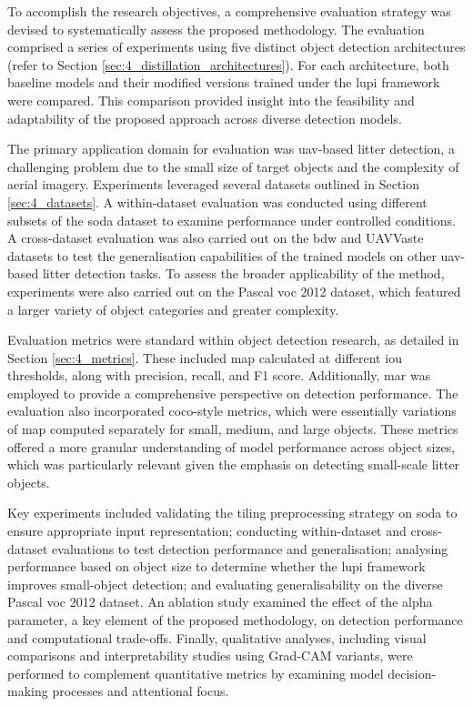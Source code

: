 To accomplish the research objectives, a comprehensive evaluation strategy was devised to systematically assess the proposed methodology. The evaluation comprised a series of experiments using five distinct object detection architectures (refer to Section \ref{sec:4_distillation_architectures}). For each architecture, both baseline models and their modified versions trained under the \gls{lupi} framework were compared. This comparison provided insight into the feasibility and adaptability of the proposed approach across diverse detection models.

The primary application domain for evaluation was \gls{uav}-based litter detection, a challenging problem due to the small size of target objects and the complexity of aerial imagery. Experiments leveraged several datasets outlined in Section \ref{sec:4_datasets}.  A within-dataset evaluation was conducted using different subsets of the \gls{soda} dataset to examine performance under controlled conditions. A cross-dataset evaluation was also carried out on the \gls{bdw} and UAVVaste datasets to test the generalisation capabilities of the trained models on other \gls{uav}-based litter detection tasks. To assess the broader applicability of the method, experiments were also carried out on the Pascal \gls{voc} 2012 dataset, which featured a larger variety of object categories and greater complexity.

Evaluation metrics were standard within object detection research, as detailed in Section \ref{sec:4_metrics}. These included \gls{map} calculated at different \gls{iou} thresholds, along with precision, recall, and F1 score. Additionally, \gls{mar} was employed to provide a comprehensive perspective on detection performance. The evaluation also incorporated \gls{coco}-style metrics, which were essentially variations of \gls{map} computed separately for small, medium, and large objects. These metrics offered a more granular understanding of model performance across object sizes, which was particularly relevant given the emphasis on detecting small-scale litter objects.

Key experiments included validating the tiling preprocessing strategy on \gls{soda} to ensure appropriate input representation; conducting within-dataset and cross-dataset evaluations to test detection performance and generalisation; analysing performance based on object size to determine whether the \gls{lupi} framework improves small-object detection; and evaluating generalisability on the diverse Pascal \gls{voc} 2012 dataset. An ablation study examined the effect of the \gls{alpha} parameter, a key element of the proposed methodology, on detection performance and computational trade-offs. Finally, qualitative analyses, including visual comparisons and interpretability studies using Grad-CAM variants, were performed to complement quantitative metrics by examining model decision-making processes and attentional focus.

